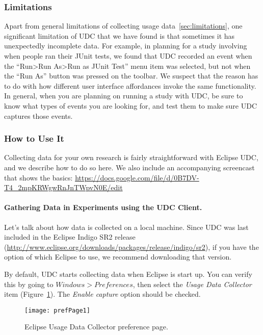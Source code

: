 \subsubsection{Limitations}

Apart from general limitations of collecting usage data~\ref{sec:limitations},
one significant limitation of UDC that we have found is that sometimes it has
unexpectedly incomplete data.
For example, in planning for a study involving when people ran their JUnit tests,
we found that UDC recorded an event when the ``Run>Run As>Run as JUnit Test'' menu item was selected,
but not when the ``Run As'' button was pressed on the toolbar.
We suspect that the reason has to do with how different user interface affordances
invoke the same functionality.
In general, when you are planning on running a study with UDC, be sure to know what
types of events you are looking for, and test them to make sure UDC captures those events.

\subsubsection{How to Use It}

Collecting data for your own research is fairly straightforward with Eclipse UDC,
and we describe how to do so here.
We also include an accompanying screencast that shows the basics:
\url{https://docs.google.com/file/d/0B7DV-T4_2mpKRWgwRnJnTWpvN0E/edit}

\paragraph{Gathering Data in Experiments using the UDC Client.}

Let's talk about how data is collected on a local machine.
Since UDC was last included in the Eclipse Indigo SR2 release
(\url{http://www.eclipse.org/downloads/packages/release/indigo/sr2}),
if you have the option of which Eclipse to use, we recommend downloading
that version.

By default, UDC starts collecting data when Eclipse is start up.
You can verify this by going to $Windows > Preferences$, then
select the \textit{Usage Data Collector} item (Figure~\ref{fig:prefPage1}).
The \textit{Enable capture} option should be checked.

\begin{figure}
  \centering
  \texttt{[image: prefPage1]}
  \caption{Eclipse Usage Data Collector preference page.}\label{fig:prefPage1}
\end{figure}

